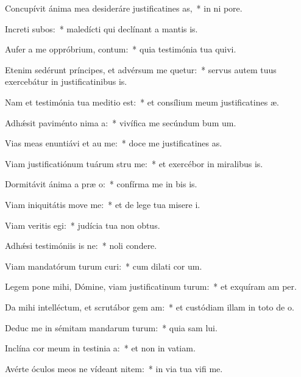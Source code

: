 \item Concupívit ánima mea desideráre justificatines as,~* in ni pore.
\item Increti subos:~* maledícti qui declínant a mantis is.
\item Aufer a me oppróbrium,  contum:~* quia testimónia tua quivi.
\item Etenim sedérunt príncipes, et advérsum me quetur:~* servus autem tuus exercebátur in justificatinibus is.
\item Nam et testimónia tua meditio  est:~* et consílium meum justificatines æ.
\item Adhǽsit paviménto nima a:~* vivífica me secúndum bum um.
\item Vias meas enuntiávi et au me:~* doce me justificatines as.
\item Viam justificatiónum tuárum stru me:~* et exercébor in miralibus is.
\item Dormitávit ánima a præ o:~* confírma me in bis is.
\item Viam iniquitátis move  me:~* et de lege tua misere i.
\item Viam veritis egi:~* judícia tua non  obtus.
\item Adhǽsi testimóniis is ne:~* noli  condere.
\item Viam mandatórum turum curi:~* cum dilati cor um.
\item Legem pone mihi, Dómine, viam justificatinum turum:~* et exquíram am per.
\item Da mihi intelléctum, et scrutábor gem am:~* et custódiam illam in toto de o.
\item Deduc me in sémitam mandarum turum:~* quia sam lui.
\item Inclína cor meum in testinia a:~* et non in vatiam.
\item Avérte óculos meos ne vídeant nitem:~* in via tua vifi me.
